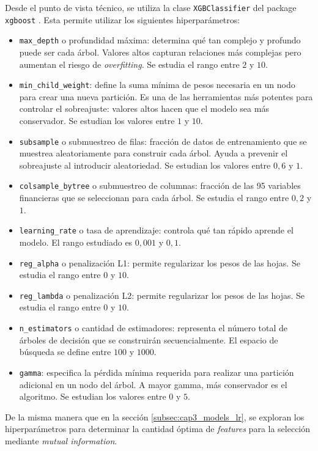 Desde el punto de vista técnico, se utiliza la clase \texttt{XGBClassifier} \citep{WEBSITE:xgboost_classifier} del package \texttt{xgboost} \citep{WEBSITE:package_xgboost}. Esta permite utilizar los siguientes hiperparámetros:

\begin{itemize}
    \item \texttt{max\_depth} o profundidad máxima: determina qué tan complejo y profundo puede ser cada árbol. Valores altos capturan relaciones más complejas pero aumentan el riesgo de \textit{overfitting}. Se estudia el rango entre $2$ y $10$.
    \item \texttt{min\_child\_weight}: define la suma mínima de pesos necesaria en un nodo para crear una nueva partición. Es una de las herramientas más potentes para controlar el sobreajuste: valores altos hacen que el modelo sea más conservador. Se estudian los valores entre $1$ y $10$.
    \item \texttt{subsample} o submuestreo de filas: fracción de datos de entrenamiento que se muestrea aleatoriamente para construir cada árbol. Ayuda a prevenir el sobreajuste al introducir aleatoriedad. Se estudian los valores entre $0,6$ y $1$.
    \item \texttt{colsample\_bytree} o submuestreo de columnas: fracción de las 95 variables financieras que se seleccionan para cada árbol. Se estudia el rango entre $0,2$ y $1$.
    \item \texttt{learning\_rate} o tasa de aprendizaje: controla qué tan rápido aprende el modelo. El rango estudiado es $0,001$ y $0,1$.
    \item \texttt{reg\_alpha} o penalización L1: permite regularizar los pesos de las hojas. Se estudia el rango entre $0$ y $10$.
    \item \texttt{reg\_lambda} o penalización L2: permite regularizar los pesos de las hojas. Se estudia el rango entre $0$ y $10$.
    \item \texttt{n\_estimators} o cantidad de estimadores: representa el número total de árboles de decisión que se construirán secuencialmente. El espacio de búsqueda se define entre $100$ y $1000$.
    \item \texttt{gamma}: especifica la pérdida mínima requerida para realizar una partición adicional en un nodo del árbol. A mayor gamma, más conservador es el algoritmo. Se estudian los valores entre $0$ y $5$.
\end{itemize}

De la misma manera que en la sección \ref{subsec:cap3_models_lr}, se exploran los hiperparámetros para determinar la cantidad óptima de \textit{features} para la selección mediante \textit{mutual information}.


